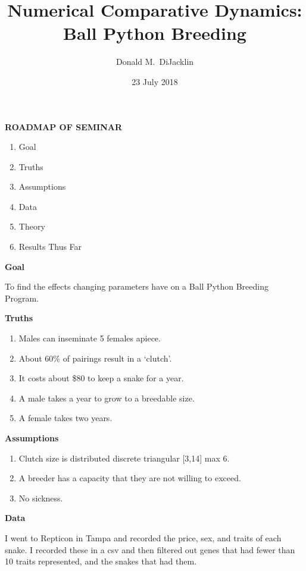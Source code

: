\documentclass[grey,handout]{beamer}
\renewcommand{\frametitle}[1]{\begin{center}\textbf{#1}\end{center}}
\begin{document}
\title{Numerical Comparative Dynamics: Ball Python Breeding}

\author{Donald M.~DiJacklin}
\date{23 July 2018}

\begin{frame}
  \titlepage
\end{frame}

\begin{frame}
\frametitle{ROADMAP OF SEMINAR}
  \begin{enumerate}[<+->]
    \item Goal
    \item Truths
    \item Assumptions
    \item Data
    \item Theory
    \item Results Thus Far
  \end{enumerate}
\end{frame}
\begin{frame}
\frametitle{Goal}
To find the effects changing parameters have on a Ball Python Breeding Program.
\end{frame}
\begin{frame}
\frametitle{Truths}
  \begin{enumerate}[<+->]
    \item Males can inseminate 5 females apiece.
    \item About 60\% of pairings result in a `clutch'.
    \item It costs about \$80 to keep a snake for a year.
    \item A male takes a year to grow to a breedable size.
    \item A female takes two years.
  \end{enumerate}
\end{frame}
\begin{frame}
  \frametitle{Assumptions}
  \begin{enumerate}
    \item Clutch size is distributed discrete triangular [3,14] max 6.
    \item A breeder has a capacity that they are not willing to exceed.
    \item No sickness.
  \end{enumerate}
\end{frame}
\begin{frame}
\frametitle{Data}
I went to Repticon in Tampa and recorded the price, sex, and traits of each snake. I recorded these in a csv and then filtered out genes that had fewer than 10 traits represented, and the snakes that had them.
\end{frame}
\end{document}
